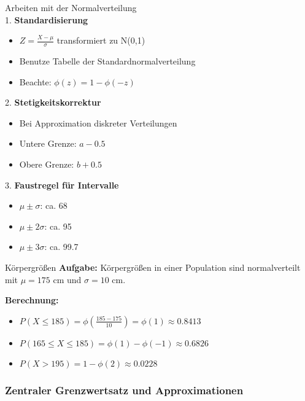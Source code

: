 \begin{KR}{Arbeiten mit der Normalverteilung}\\
1. \textbf{Standardisierung}
   \begin{itemize}
   \item $Z = \frac{X-\mu}{\sigma}$ transformiert zu N(0,1)
   \item Benutze Tabelle der Standardnormalverteilung
   \item Beachte: $\phi(z) = 1 - \phi(-z)$
   \end{itemize}

2. \textbf{Stetigkeitskorrektur}
   \begin{itemize}
   \item Bei Approximation diskreter Verteilungen
   \item Untere Grenze: $a - 0.5$
   \item Obere Grenze: $b + 0.5$
   \end{itemize}

3. \textbf{Faustregel für Intervalle}
   \begin{itemize}
   \item $\mu \pm \sigma$: ca. 68%
   \item $\mu \pm 2\sigma$: ca. 95%
   \item $\mu \pm 3\sigma$: ca. 99.7%
   \end{itemize}
\end{KR}

\begin{example2}{Körpergrößen}
\textbf{Aufgabe:} Körpergrößen in einer Population sind normalverteilt mit $\mu = 175$ cm und $\sigma = 10$ cm.

\textbf{Berechnung:}
\begin{itemize}
\item $P(X \leq 185) = \phi(\frac{185-175}{10}) = \phi(1) \approx 0.8413$
\item $P(165 \leq X \leq 185) = \phi(1) - \phi(-1) \approx 0.6826$
\item $P(X > 195) = 1 - \phi(2) \approx 0.0228$
\end{itemize}
\end{example2}

\subsubsection{Zentraler Grenzwertsatz und Approximationen}

